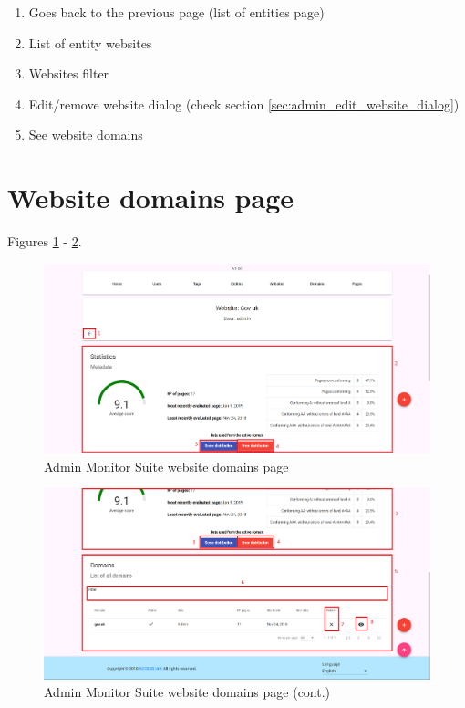 \begin{enumerate}
    \item Goes back to the previous page (list of entities page)
    \item List of entity websites
    \item Websites filter
    \item Edit/remove website dialog (check section \ref{sec:admin_edit_website_dialog})
    \item See website domains
\end{enumerate}

\clearpage

\section{Website domains page}

Figures \ref{fig:admin_website_domains_page} - \ref{fig:admin_website_domains_page_2}.

\begin{figure}[H]
    \centering
    \includegraphics[width=\linewidth]{lib/images/admin/admin_website_domains_page.png}
    \caption{Admin Monitor Suite website domains page}
    \label{fig:admin_website_domains_page}
\end{figure}

\begin{figure}[H]
    \centering
    \includegraphics[width=\linewidth]{lib/images/admin/admin_website_domains_page_2.png}
    \caption{Admin Monitor Suite website domains page (cont.)}
    \label{fig:admin_website_domains_page_2}
\end{figure}

